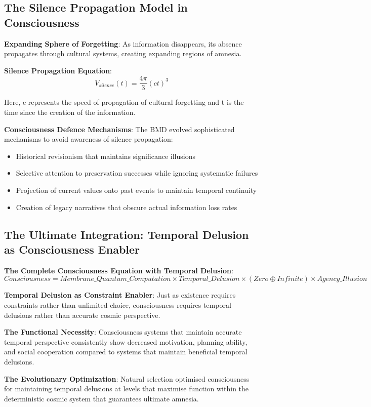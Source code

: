 \documentclass[12pt]{article}
\begin{document}
\subsection{The Silence Propagation Model in Consciousness}

\textbf{Expanding Sphere of Forgetting}: As information disappears, its absence propagates through cultural systems, creating expanding regions of amnesia.

\textbf{Silence Propagation Equation}:
$$V_{silence}(t) = \frac{4\pi}{3}(ct)^3$$

Here, c represents the speed of propagation of cultural forgetting and t is the time since the creation of the information.

\textbf{Consciousness Defence Mechanisms}: The BMD evolved sophisticated mechanisms to avoid awareness of silence propagation:
\begin{itemize}
\item Historical revisionism that maintains significance illusions
\item Selective attention to preservation successes while ignoring systematic failures
\item Projection of current values onto past events to maintain temporal continuity
\item Creation of legacy narratives that obscure actual information loss rates
\end{itemize}

\subsection{The Ultimate Integration: Temporal Delusion as Consciousness Enabler}

\textbf{The Complete Consciousness Equation with Temporal Delusion}:
$$Consciousness = Membrane\_Quantum\_Computation \times Temporal\_Delusion \times (Zero \oplus Infinite) \times Agency\_Illusion$$

\textbf{Temporal Delusion as Constraint Enabler}: Just as existence requires constraints rather than unlimited choice, consciousness requires temporal delusions rather than accurate cosmic perspective.

\textbf{The Functional Necessity}: Consciousness systems that maintain accurate temporal perspective consistently show decreased motivation, planning ability, and social cooperation compared to systems that maintain beneficial temporal delusions.

\textbf{The Evolutionary Optimization}: Natural selection optimised consciousness for maintaining temporal delusions at levels that maximise function within the deterministic cosmic system that guarantees ultimate amnesia.
\end{document}
